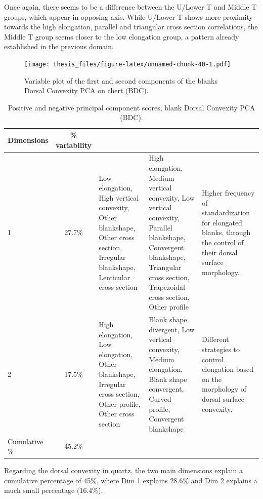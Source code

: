 \documentclass[12pt,twoside]{reedthesis}
\begin{document}
Once again, there seems to be a difference between the U/Lower T and Middle T groups, which appear in opposing axis. While U/Lower T shows more proximity towards the high elongation, parallel and triangular cross section correlations, the Middle T group seems closer to the low elongation group, a pattern already established in the previous domain.
\begin{figure}
\centering
\texttt{[image: thesis\_files/figure-latex/unnamed-chunk-40-1.pdf]}
\caption{\label{fig:unnamed-chunk-40}Variable plot of the first and second components of the blanks Dorsal Convexity PCA on chert (BDC).}
\end{figure}
\begin{table}

\caption{\label{tab:unnamed-chunk-41}Positive and negative principal component scores, blank Dorsal Convexity PCA (BDC).}
\centering
\begin{tabular}[t]{lc>{\raggedright\arraybackslash}p{3cm}>{\raggedright\arraybackslash}p{3cm}>{\raggedright\arraybackslash}p{3cm}}
\toprule
\multicolumn{1}{c}{\textbf{Dimensions}} & \multicolumn{1}{c}{\textbf{\% variability}} & \multicolumn{1}{>{\centering\arraybackslash}p{3cm}}{\textbf{+}} & \multicolumn{1}{>{\centering\arraybackslash}p{3cm}}{\textbf{-}} & \multicolumn{1}{>{\centering\arraybackslash}p{3cm}}{\textbf{Interpretation}}\\
\midrule
1 & 27.7\% & Low elongation, High vertical convexity, Other blankshape, Other cross section, Irregular blankshape, Lenticular cross section & High elongation, Medium vertical convexity, Low vertical convexity, Parallel blankshape, Convergent blankshape, Triangular cross section, Trapezoidal cross section, Other profile & Higher frequency of standardization for elongated blanks, through the control of their dorsal surface morphology.\\
2 & 17.5\% & High elongation, Low elongation, Other blankshape, Irregular cross section, Other profile, Other cross section & Blank shape divergent, Low vertical convexity, Medium elongation, Blank shape convergent, Curved profile, Convergent blankshape & Different strategies to control elongation based on the morphology of dorsal surface convexity.\\
Cumulative \% & 45.2\% &  &  & \\
\bottomrule
\end{tabular}
\end{table}
Regarding the dorsal convexity in quartz, the two main dimensions explain a cumulative percentage of 45\%, where Dim 1 explains 28.6\% and Dim 2 explains a much small percentage (16.4\%).
\end{document}

